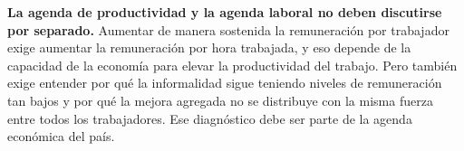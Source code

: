 \textbf{La agenda de productividad y la agenda laboral no deben discutirse por separado.} Aumentar de manera sostenida la remuneración por trabajador exige aumentar la remuneración por hora trabajada, y eso depende de la capacidad de la economía para elevar la productividad del trabajo. Pero también exige entender por qué la informalidad sigue teniendo niveles de remuneración tan bajos y por qué la mejora agregada no se distribuye con la misma fuerza entre todos los trabajadores. Ese diagnóstico debe ser parte de la agenda económica del país.
